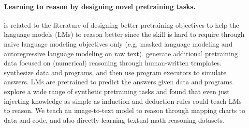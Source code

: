 \paragraph{Learning to reason by designing novel pretraining tasks.} \model{} is related to the literature of designing better pretraining objectives to help the language models (LMs) to reason better since the skill is hard to require through naive language modeling objectives only (e.g, masked language modeling and autoregressive language modeling on raw text).
\citet{geva-etal-2020-injecting, eisenschlos-etal-2020-understanding} generate additional pretraining data focused on (numerical) reasoning through human-written templates. 
\citet{pi-etal-2022-reasoning} synthesize data and programs, and then use program executors to simulate answers. LMs are pretrained to predict the answers given data and programs.
\citet{wu2022insights} explore a wide range of synthetic pretraining tasks and found that even just injecting knowledge as simple as induction and deduction rules could teach LMs to reason. We teach an image-to-text model to reason through mapping charts to data and code, and also directly learning textual math reasoning datasets.
